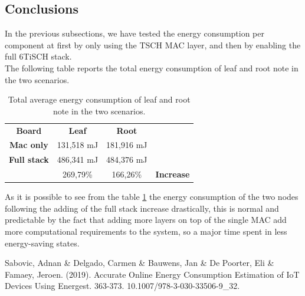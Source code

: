 \documentclass[conference]{IEEEtran}
\begin{document}
\subsection{Conclusions}
In the previous subsections, we have tested the energy consumption per component at first by only using the TSCH MAC layer, and then by enabling the full 6TiSCH stack.\\
The following table reports the total energy consumption of leaf and root note in the two scenarios.
\begin{table}[H]
	\begin{center}
		\begin{tabular}{cccl}
			\cline{1-3}
			\textbf{Board}      & \textbf{Leaf} & \textbf{Root} & \textbf{}         \\ \cline{1-3}
			\textbf{Mac only}   & 131,518 mJ      & 181,916 mJ       &                   \\
			\textbf{Full stack} & 486,341 mJ      & 484,376 mJ      &                   \\ \hline
			\textbf{}           & 269,79\%      & 166,26\%      & \textbf{Increase} \\ \hline
		\end{tabular}
	\end{center}
	\caption{Total average energy consumption of leaf and root note in the two scenarios.}
	\label{tab:scenarios1Table}
\end{table}

As it is possible to see from the table \ref{tab:scenarios1Table} the energy consumption of the two nodes following the adding of the full stack increase drastically, this is normal and predictable by the fact that adding more layers on top of the single MAC add more computational requirements to the system, so a major time spent in less energy-saving states.

\begin{thebibliography}{00}
 Sabovic, Adnan \& Delgado, Carmen \& Bauwens, Jan \& De Poorter, Eli \& Famaey, Jeroen. (2019). Accurate Online Energy Consumption Estimation of IoT Devices Using Energest. 363-373. 10.1007/978-3-030-33506-9\_32. 
\end{thebibliography}
\end{document}
